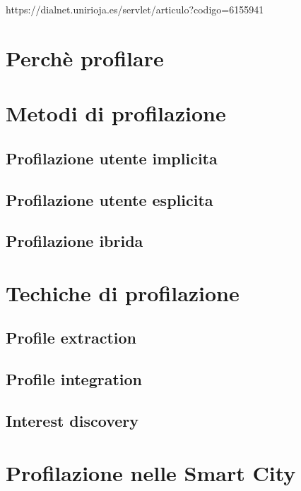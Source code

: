 https://dialnet.unirioja.es/servlet/articulo?codigo=6155941

\section{Perchè profilare}


\section{Metodi di profilazione}
\subsection{Profilazione utente implicita}
\subsection{Profilazione utente esplicita}
\subsection{Profilazione ibrida}
\section{Techiche di profilazione}
\subsection{Profile extraction}
\subsection{Profile integration}
\subsection{Interest discovery}


\section{Profilazione nelle Smart City}




